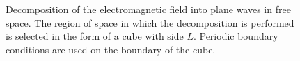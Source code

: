 \begin{figure}
\centering

\caption{Decomposition of the electromagnetic field into plane waves in free
  space. The region of space in which the decomposition is performed is selected in the form of a cube with side
  $L$. Periodic boundary conditions are used on the boundary of the cube.}
\label{figCh1_Vfree}
\end{figure}